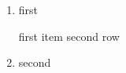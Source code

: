 \begin{enumerate}
  \setlength{\itemsep}{3cm}
  \setlength{\parskip}{2cm}
  \item first
	  
	  first item second row
  \item second
\end{enumerate}
